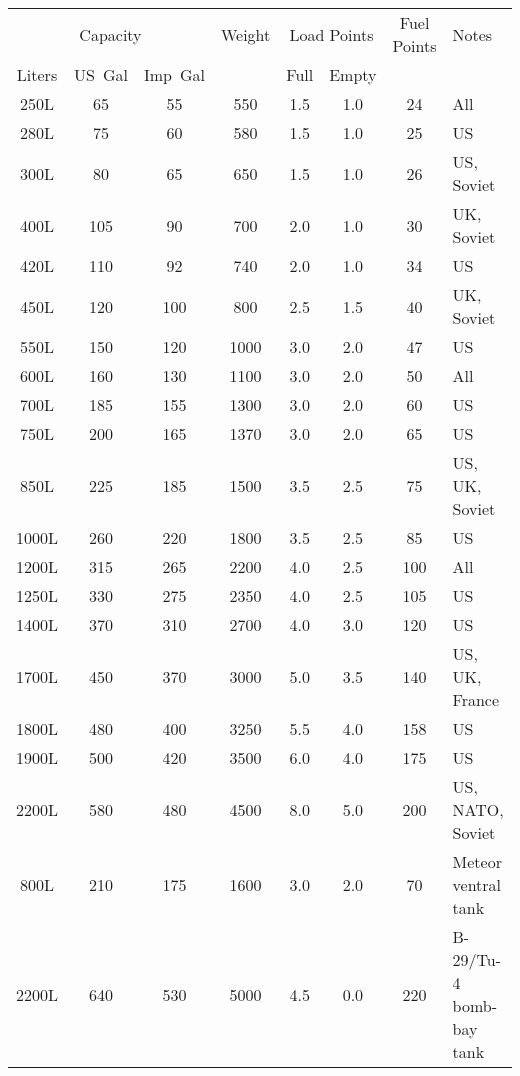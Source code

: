 \begin{twocolumntablefloat}
\begin{twocolumntable}
{
\begin{tabular}{cccccccl}
\toprule
\multicolumn{3}{c}{Capacity}&
Weight&
\multicolumn{2}{c}{Load Points}&
Fuel Points&
Notes\\
\cmidrule{1-3}
\cmidrule{5-6}
Liters&US~Gal&Imp~Gal&&Full&Empty&&\\
\midrule
\phantom{0}250L&\phantom{0}65&\phantom{0}55&\phantom{0}550&1.5&1.0&\phantom{0}24&All\\
\phantom{0}280L&\phantom{0}75&\phantom{0}60&\phantom{0}580&1.5&1.0&\phantom{0}25&US\\
\phantom{0}300L&\phantom{0}80&\phantom{0}65&\phantom{0}650&1.5&1.0&\phantom{0}26&US, Soviet\\
\phantom{0}400L&\phantom{}105&\phantom{0}90&\phantom{0}700&2.0&1.0&\phantom{0}30&UK, Soviet\\
\phantom{0}420L&\phantom{}110&\phantom{0}92&\phantom{0}740&2.0&1.0&\phantom{0}34&US\\
\phantom{0}450L&\phantom{}120&\phantom{}100&\phantom{0}800&2.5&1.5&\phantom{0}40&UK, Soviet\\
\phantom{0}550L&\phantom{}150&\phantom{}120&\phantom{}1000&3.0&2.0&\phantom{0}47&US\\
\phantom{0}600L&\phantom{}160&\phantom{}130&\phantom{}1100&3.0&2.0&\phantom{0}50&All\\
\phantom{0}700L&\phantom{}185&\phantom{}155&\phantom{}1300&3.0&2.0&\phantom{0}60&US\\
\phantom{0}750L&\phantom{}200&\phantom{}165&\phantom{}1370&3.0&2.0&\phantom{0}65&US\\
\phantom{0}850L&\phantom{}225&\phantom{}185&\phantom{}1500&3.5&2.5&\phantom{0}75&US, UK, Soviet\\
\phantom{}1000L&\phantom{}260&\phantom{}220&\phantom{}1800&3.5&2.5&\phantom{0}85&US\\
\phantom{}1200L&\phantom{}315&\phantom{}265&\phantom{}2200&4.0&2.5&\phantom{}100&All\\
\phantom{}1250L&\phantom{}330&\phantom{}275&\phantom{}2350&4.0&2.5&\phantom{}105&US\\
\phantom{}1400L&\phantom{}370&\phantom{}310&\phantom{}2700&4.0&3.0&\phantom{}120&US\\
\phantom{}1700L&\phantom{}450&\phantom{}370&\phantom{}3000&5.0&3.5&\phantom{}140&US, UK, France\\
\phantom{}1800L&\phantom{}480&\phantom{}400&\phantom{}3250&5.5&4.0&\phantom{}158&US\\
\phantom{}1900L&\phantom{}500&\phantom{}420&\phantom{}3500&6.0&4.0&\phantom{}175&US\\
\phantom{}2200L&\phantom{}580&\phantom{}480&\phantom{}4500&8.0&5.0&\phantom{}200&US, NATO, Soviet\\
\midrule
\phantom{0}800L&\phantom{}210&\phantom{}175&\phantom{}1600&3.0&2.0&\phantom{0}70&Meteor ventral tank\\
\phantom{}2200L&\phantom{}640&\phantom{}530&\phantom{}5000&4.5&0.0&\phantom{0}220&B-29/Tu-4 bomb-bay tank\\
\bottomrule
\end{tabular}

}
\end{twocolumntable}
\end{twocolumntablefloat}
